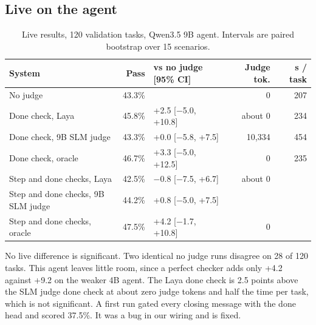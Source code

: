 \documentclass[10pt,a4paper]{article}
\newcommand{\tablestyle}{\footnotesize\rowcolors{2}{rowshade}{white}}
\begin{document}
\subsection{Live on the agent}
\begin{table}[H]
\centering\tablestyle
\caption{Live results, 120 validation tasks, Qwen3.5 9B agent. Intervals are paired bootstrap over 15 scenarios.}\label{tab:live}
\begin{tabularx}{\linewidth}{Yrlrr}
\toprule
\textbf{System} & \textbf{Pass} & \textbf{vs no judge [95\% CI]} & \textbf{Judge tok.} & \textbf{s / task} \\
\midrule
No judge & 43.3\% & & 0 & 207 \\
Done check, Laya & 45.8\% & +2.5 [$-$5.0, +10.8] & about 0 & 234 \\
Done check, 9B SLM judge & 43.3\% & +0.0 [$-$5.8, +7.5] & 10,334 & 454 \\
Done check, oracle & 46.7\% & +3.3 [$-$5.0, +12.5] & 0 & 235 \\
Step and done checks, Laya & 42.5\% & $-$0.8 [$-$7.5, +6.7] & about 0 & \\
Step and done checks, 9B SLM judge & 44.2\% & +0.8 [$-$5.0, +7.5] & & \\
Step and done checks, oracle & 47.5\% & +4.2 [$-$1.7, +10.8] & 0 & \\
\bottomrule
\end{tabularx}
\end{table}
No live difference is significant. Two identical no judge runs disagree on 28 of 120 tasks. This agent leaves little room, since a perfect checker adds only +4.2 against +9.2 on the weaker 4B agent. The Laya done check is 2.5 points above the SLM judge done check at about zero judge tokens and half the time per task, which is not significant. A first run gated every closing message with the done head and scored 37.5\%. It was a bug in our wiring and is fixed.
\end{document}
